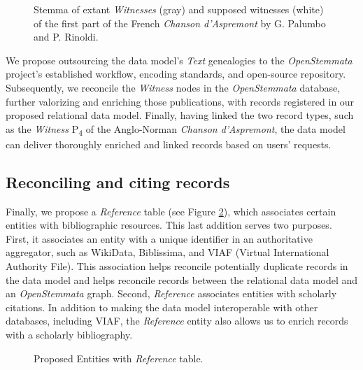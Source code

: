 \begin{figure}[htb!]
    \begin{center}
        
    \end{center}
\caption{Stemma of extant \textit{Witnesses} (gray) and supposed witnesses (white) of the first part of the French \textit{Chanson d'Aspremont} by G. Palumbo and P. Rinoldi.}
\label{fig:GraphFramework}
\end{figure}

We propose outsourcing the data model's \textit{Text} genealogies to the \textit{OpenStemmata} project's established workflow, encoding standards, and open-source repository. Subsequently, we reconcile the \textit{Witness} nodes in the \textit{OpenStemmata} database, further valorizing and enriching those publications, with records registered in our proposed relational data model. Finally, having linked the two record types, such as the \textit{Witness} P\textsubscript{4} of the Anglo-Norman \textit{Chanson d'Aspremont}, the data model can deliver thoroughly enriched and linked records based on users' requests.

\subsection{Reconciling and citing records}

Finally, we propose a \textit{Reference} table (see Figure \ref{fig:ProposedEntitiesReference}), which associates certain entities with bibliographic resources. This last addition serves two purposes. First, it associates an entity with a unique identifier in an authoritative aggregator, such as WikiData, Biblissima, and VIAF (Virtual International Authority File). This association helps reconcile potentially duplicate records in the data model and helps reconcile records between the relational data model and an \textit{OpenStemmata} graph. Second, \textit{Reference} associates entities with scholarly citations. In addition to making the data model interoperable with other databases, including VIAF, the \textit{Reference} entity also allows us to enrich records with a scholarly bibliography.

\begin{figure}[htb!]
    \begin{center}
        
    \end{center}
\caption{Proposed Entities with \textit{Reference} table.}
\label{fig:ProposedEntitiesReference}
\end{figure}

